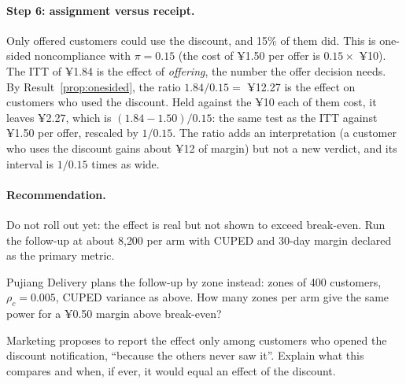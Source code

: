 \documentclass[11pt]{article}
\begin{document}
\paragraph{Step 6: assignment versus receipt.} Only offered customers could use the discount, and 15\% of them
did. This is one-sided noncompliance with $\pi = 0.15$ (the cost of ¥1.50 per offer is $0.15 \times$ ¥10). The ITT of
¥1.84 is the effect of \emph{offering}, the number the offer decision needs. By
Result~\ref{prop:onesided}, the ratio $1.84/0.15 = $ ¥12.27 is the effect on customers who used the discount.
Held against the ¥10 each of them cost, it leaves ¥2.27, which is $(1.84 - 1.50)/0.15$: the same test as the ITT
against ¥1.50 per offer, rescaled by $1/0.15$. The ratio adds an interpretation (a customer who uses the
discount gains about ¥12 of margin) but not a new verdict, and its interval is $1/0.15$ times as wide.

\paragraph{Recommendation.} Do not roll out yet: the effect is real but not shown to exceed break-even. Run the
follow-up at about 8{,}200 per arm with CUPED and 30-day margin declared as the primary metric.

\begin{exercise}[computation]
Pujiang Delivery plans the follow-up by zone instead: zones of 400 customers, $\rho_c = 0.005$, CUPED variance as
above. How many zones per arm give the same power for a ¥0.50 margin above break-even?
\end{exercise}

\begin{exercise}[judgment]
Marketing proposes to report the effect only among customers who opened the discount notification, ``because
the others never saw it''. Explain what this compares and when, if ever, it would equal an effect of the
discount.
\end{exercise}
\end{document}
